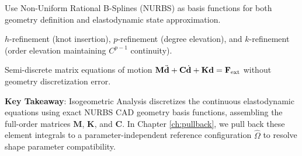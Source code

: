 \begin{tcolorbox}[colback=lightbg, colframe=primaryblue, title=\textbf{Chapter Summary: CAD-Integrated Discretization}, fonttitle=\bfseries]
    \begin{description}[leftmargin=!, labelwidth=3.4cm]
        \item[\textbf{Core Paradigm}] Use Non-Uniform Rational B-Splines (NURBS) as basis functions for both geometry definition and elastodynamic state approximation.
        \item[\textbf{Refinement Vectors}] $h$-refinement (knot insertion), $p$-refinement (degree elevation), and $k$-refinement (order elevation maintaining $C^{p-1}$ continuity).
        \item[\textbf{System Output}] Semi-discrete matrix equations of motion $\mathbf{M}\ddot{\mathbf{d}} + \mathbf{C}\dot{\mathbf{d}} + \mathbf{K}\mathbf{d} = \mathbf{F}_{\text{ext}}$ without geometry discretization error.
    \end{description}
    
    \vspace{0.2cm}
    \textbf{Key Takeaway}: Isogeometric Analysis discretizes the continuous elastodynamic equations using exact NURBS CAD geometry basis functions, assembling the full-order matrices $\mathbf{M}$, $\mathbf{K}$, and $\mathbf{C}$. In Chapter \ref{ch:pullback}, we pull back these element integrals to a parameter-independent reference configuration $\hat{\Omega}$ to resolve shape parameter compatibility.
\end{tcolorbox}
